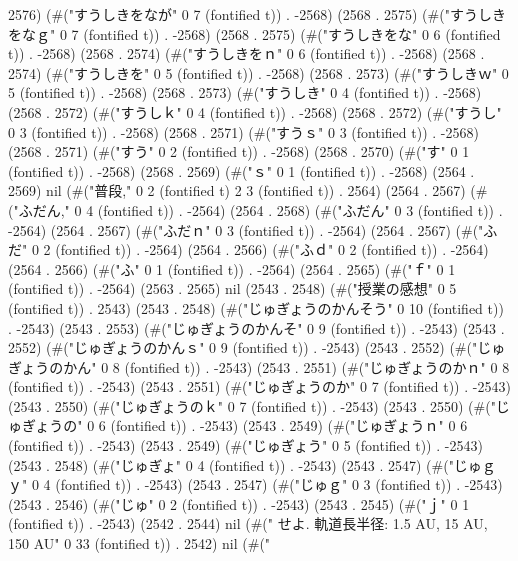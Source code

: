 2576) (#("すうしきをなが" 0 7 (fontified t)) . -2568) (2568 . 2575) (#("すうしきをなｇ" 0 7 (fontified t)) . -2568) (2568 . 2575) (#("すうしきをな" 0 6 (fontified t)) . -2568) (2568 . 2574) (#("すうしきをｎ" 0 6 (fontified t)) . -2568) (2568 . 2574) (#("すうしきを" 0 5 (fontified t)) . -2568) (2568 . 2573) (#("すうしきｗ" 0 5 (fontified t)) . -2568) (2568 . 2573) (#("すうしき" 0 4 (fontified t)) . -2568) (2568 . 2572) (#("すうしｋ" 0 4 (fontified t)) . -2568) (2568 . 2572) (#("すうし" 0 3 (fontified t)) . -2568) (2568 . 2571) (#("すうｓ" 0 3 (fontified t)) . -2568) (2568 . 2571) (#("すう" 0 2 (fontified t)) . -2568) (2568 . 2570) (#("す" 0 1 (fontified t)) . -2568) (2568 . 2569) (#("ｓ" 0 1 (fontified t)) . -2568) (2564 . 2569) nil (#("普段," 0 2 (fontified t) 2 3 (fontified t)) . 2564) (2564 . 2567) (#("ふだん," 0 4 (fontified t)) . -2564) (2564 . 2568) (#("ふだん" 0 3 (fontified t)) . -2564) (2564 . 2567) (#("ふだｎ" 0 3 (fontified t)) . -2564) (2564 . 2567) (#("ふだ" 0 2 (fontified t)) . -2564) (2564 . 2566) (#("ふｄ" 0 2 (fontified t)) . -2564) (2564 . 2566) (#("ふ" 0 1 (fontified t)) . -2564) (2564 . 2565) (#("ｆ" 0 1 (fontified t)) . -2564) (2563 . 2565) nil (2543 . 2548) (#("授業の感想" 0 5 (fontified t)) . 2543) (2543 . 2548) (#("じゅぎょうのかんそう" 0 10 (fontified t)) . -2543) (2543 . 2553) (#("じゅぎょうのかんそ" 0 9 (fontified t)) . -2543) (2543 . 2552) (#("じゅぎょうのかんｓ" 0 9 (fontified t)) . -2543) (2543 . 2552) (#("じゅぎょうのかん" 0 8 (fontified t)) . -2543) (2543 . 2551) (#("じゅぎょうのかｎ" 0 8 (fontified t)) . -2543) (2543 . 2551) (#("じゅぎょうのか" 0 7 (fontified t)) . -2543) (2543 . 2550) (#("じゅぎょうのｋ" 0 7 (fontified t)) . -2543) (2543 . 2550) (#("じゅぎょうの" 0 6 (fontified t)) . -2543) (2543 . 2549) (#("じゅぎょうｎ" 0 6 (fontified t)) . -2543) (2543 . 2549) (#("じゅぎょう" 0 5 (fontified t)) . -2543) (2543 . 2548) (#("じゅぎょ" 0 4 (fontified t)) . -2543) (2543 . 2547) (#("じゅｇｙ" 0 4 (fontified t)) . -2543) (2543 . 2547) (#("じゅｇ" 0 3 (fontified t)) . -2543) (2543 . 2546) (#("じゅ" 0 2 (fontified t)) . -2543) (2543 . 2545) (#("ｊ" 0 1 (fontified t)) . -2543) (2542 . 2544) nil (#(" せよ. 軌道長半径: 1.5 AU, 15 AU, 150 AU" 0 33 (fontified t)) . 2542) nil (#("
